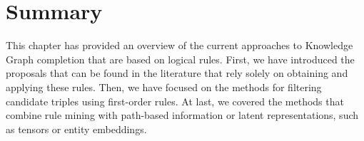 




\section{Summary}\label{sec:rule-summary}
This chapter has provided an overview of the current approaches to Knowledge Graph completion that are based on logical rules. First, we have introduced the proposals that can be found in the literature that rely solely on obtaining and applying these rules. Then, we have focused on the methods for filtering candidate triples using first-order rules. At last, we covered the methods that combine rule mining with path-based information or latent representations, such as tensors or entity embeddings.